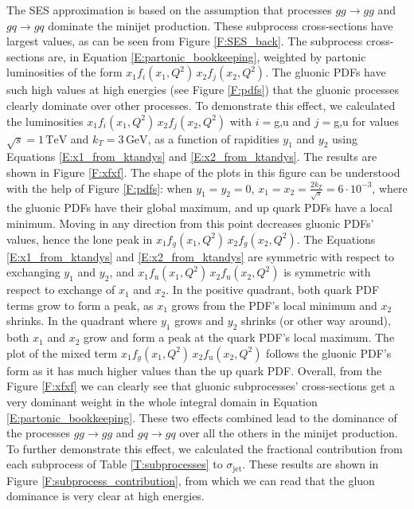 \documentclass[a4paper, twoside, english, 12pt]{report}
\begin{document}
The SES approximation is based on the assumption that processes $gg\rightarrow gg$ and $gq\rightarrow gq$ dominate the minijet production. These subprocess cross-sections have largest values, as can be seen from Figure \ref{F:SES_back}. The subprocess cross-sections are, in Equation \eqref{E:partonic_bookkeeping}, weighted by partonic luminosities of the form $x_1f_i(x_1,Q^2)\,x_2f_j(x_2,Q^2)$. The gluonic PDFs have such high values at high energies (see Figure \ref{F:pdfs}) that the gluonic processes clearly dominate over other processes. To demonstrate this effect, we calculated the luminosities $x_1f_i(x_1,Q^2)\,x_2f_j(x_2,Q^2)$ with $i=$g,u and $j=$g,u for values $\sqrt{s}=1\,\text{TeV}$ and $k_T=3\,\text{GeV}$, as a function of rapidities $y_1$ and $y_2$ using Equations \eqref{E:x1_from_ktandys} and \eqref{E:x2_from_ktandys}. The results are shown in Figure \ref{F:xfxf}. The shape of the plots in this figure can be understood with the help of Figure \ref{F:pdfs}: when $y_1=y_2=0$, $x_1=x_2=\frac{2k_T}{\sqrt{s}}=6\cdot10^{-3}$, where the gluonic PDFs have their global maximum, and up quark PDFs have a local minimum. Moving in any direction from this point decreases gluonic PDFs' values, hence the lone peak in $x_1f_g(x_1,Q^2)\,x_2f_g(x_2,Q^2)$. The Equations \eqref{E:x1_from_ktandys} and \eqref{E:x2_from_ktandys} are symmetric with respect to exchanging $y_1$ and $y_2$, and $x_1f_{\text{u}}(x_1,Q^2)\,x_2f_{\text{u}}(x_2,Q^2)$ is symmetric with respect to exchange of $x_1$ and $x_2$. In the positive quadrant, both quark PDF terms grow to form a peak, as $x_1$ grows from the PDF's local minimum and $x_2$ shrinks. In the quadrant where $y_1$ grows and $y_2$ shrinks (or other way around), both $x_1$ and $x_2$ grow and form a peak at the quark PDF's local maximum. The plot of the mixed term $x_1f_{g}(x_1,Q^2)\,x_2f_{\text{u}}(x_2,Q^2)$ follows the gluonic PDF's form as it has much higher values than the up quark PDF. Overall, from the Figure \ref{F:xfxf} we can clearly see that gluonic subprocesses' cross-sections get a very dominant weight in the whole integral domain in Equation \eqref{E:partonic_bookkeeping}. These two effects combined lead to the dominance of the processes $gg\rightarrow gg$ and $gq\rightarrow gq$ over all the others in the minijet production. To further demonstrate this effect, we calculated the fractional contribution from each subprocess of Table \ref{T:subprocesses} to $\sigma_{\text{jet}}$. These results are shown in Figure \ref{F:subprocess_contribution}, from which we can read that the gluon dominance is very clear at high energies.
\end{document}
